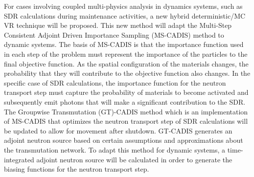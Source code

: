For cases involving coupled multi-physics analysis in dynamics systems, such as SDR calculations
during maintenance activities,
a new hybrid deterministic/MC VR technique will be proposed.
This new method will adapt the Multi-Step Consistent Adjoint Driven Importance Sampling
(MS-CADIS) method to dynamic systems.
 The basis of MS-CADIS is that the importance function used
in each step of the problem must represent the importance of the particles to
the final objective function.  As the spatial configuration of the materials
changes, the probability that they will contribute to the objective function
also changes.
In the specific case of SDR calculations, the importance function for the neutron transport step
must capture the probability of materials to become activated and subsequently emit photons that
will make a significant contribution to the SDR.
The Groupwise Transmutation (GT)-CADIS method 
which is an implementation of MS-CADIS
that optimizes the neutron transport step of SDR calculations will be updated to allow for movement after shutdown.
GT-CADIS generates an adjoint
neutron source based on certain assumptions and approximations about the
transmutation network.  To adapt this method for dynamic systems, 
a time-integrated adjoint
neutron source will be calculated 
in order to generate the biasing functions for the neutron transport step.




